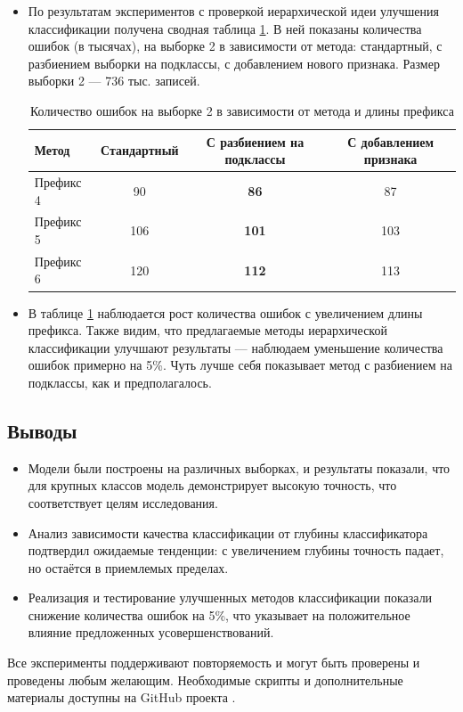 \documentclass{article}
\begin{document}
\begin{itemize}
    \item По результатам экспериментов  с проверкой иерархической идеи улучшения классификации получена сводная таблица \ref{tab:1}. В ней показаны количества ошибок (в тысячах), на выборке 2 в зависимости от метода: стандартный, с разбиением выборки на подклассы, с добавлением нового признака. Размер выборки 2 --- 736 тыс. записей.
    
    \begin{table}[ht]
        \centering
        \begin{tabular}{|l|c|c|c|}
            \hline
            \textbf{Метод} & \textbf{Стандартный} & \textbf{С разбиением на подклассы} & \textbf{С добавлением признака} \\ \hline
            Префикс 4 & 90 & \textbf{86} & 87 \\ \hline
            Префикс 5 & 106 & \textbf{101} & 103 \\ \hline
            Префикс 6 & 120 & \textbf{112} & 113 \\ \hline
        \end{tabular}
        \caption{Количество ошибок на выборке 2 в зависимости от метода и длины префикса}
        \label{tab:1}
    \end{table}
    
    \item В таблице \ref{tab:1} наблюдается  рост количества ошибок с увеличением длины префикса. Также видим, что предлагаемые методы иерархической классификации улучшают результаты --- наблюдаем уменьшение количества ошибок примерно на 5\%. Чуть лучше себя показывает метод с разбиением на подклассы, как и предполагалось. 
\end{itemize}


\subsection{Выводы}
\begin{itemize}
    \item Модели были построены на различных выборках, и результаты показали, что для крупных классов модель демонстрирует высокую точность, что соответствует целям исследования.
    \item Анализ зависимости качества классификации от глубины классификатора подтвердил ожидаемые тенденции: с увеличением глубины точность падает, но остаётся в приемлемых пределах.
    \item Реализация и тестирование улучшенных методов классификации показали снижение количества ошибок на 5\%, что указывает на положительное влияние предложенных усовершенствований.
\end{itemize}
Все эксперименты поддерживают повторяемость и могут быть проверены и проведены любым желающим. Необходимые скрипты и дополнительные материалы доступны на GitHub проекта \cite{firsov2024project}.
\end{document}
